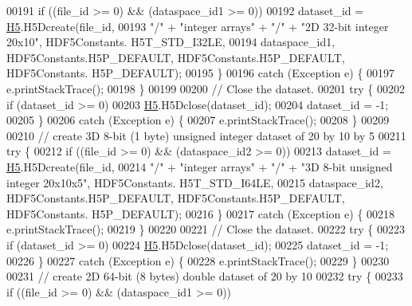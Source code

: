 \begin{DoxyCode}
00191             \textcolor{keywordflow}{if} ((file\_id >= 0) && (dataspace\_id1 >= 0))
00192                 dataset\_id = \hyperlink{namespace_h5}{H5}.H5Dcreate(file\_id,
00193                         \textcolor{stringliteral}{"/"} + \textcolor{stringliteral}{"integer arrays"} + \textcolor{stringliteral}{"/"} + \textcolor{stringliteral}{"2D 32-bit integer 20x10"}, HDF5Constants.
      H5T\_STD\_I32LE,
00194                         dataspace\_id1, HDF5Constants.H5P\_DEFAULT, HDF5Constants.H5P\_DEFAULT, HDF5Constants.
      H5P\_DEFAULT);
00195         \}
00196         \textcolor{keywordflow}{catch} (Exception e) \{
00197             e.printStackTrace();
00198         \}
00199 
00200         \textcolor{comment}{// Close the dataset.}
00201         \textcolor{keywordflow}{try} \{
00202             \textcolor{keywordflow}{if} (dataset\_id >= 0)
00203                 \hyperlink{namespace_h5}{H5}.H5Dclose(dataset\_id);
00204             dataset\_id = -1;
00205         \}
00206         \textcolor{keywordflow}{catch} (Exception e) \{
00207             e.printStackTrace();
00208         \}
00209 
00210         \textcolor{comment}{// create 3D 8-bit (1 byte) unsigned integer dataset of 20 by 10 by 5}
00211         \textcolor{keywordflow}{try} \{
00212             \textcolor{keywordflow}{if} ((file\_id >= 0) && (dataspace\_id2 >= 0))
00213                 dataset\_id = \hyperlink{namespace_h5}{H5}.H5Dcreate(file\_id,
00214                         \textcolor{stringliteral}{"/"} + \textcolor{stringliteral}{"integer arrays"} + \textcolor{stringliteral}{"/"} + \textcolor{stringliteral}{"3D 8-bit unsigned integer 20x10x5"}, HDF5Constants.
      H5T\_STD\_I64LE,
00215                         dataspace\_id2, HDF5Constants.H5P\_DEFAULT, HDF5Constants.H5P\_DEFAULT, HDF5Constants.
      H5P\_DEFAULT);
00216         \}
00217         \textcolor{keywordflow}{catch} (Exception e) \{
00218             e.printStackTrace();
00219         \}
00220 
00221         \textcolor{comment}{// Close the dataset.}
00222         \textcolor{keywordflow}{try} \{
00223             \textcolor{keywordflow}{if} (dataset\_id >= 0)
00224                 \hyperlink{namespace_h5}{H5}.H5Dclose(dataset\_id);
00225             dataset\_id = -1;
00226         \}
00227         \textcolor{keywordflow}{catch} (Exception e) \{
00228             e.printStackTrace();
00229         \}
00230 
00231         \textcolor{comment}{// create 2D 64-bit (8 bytes) double dataset of 20 by 10}
00232         \textcolor{keywordflow}{try} \{
00233             \textcolor{keywordflow}{if} ((file\_id >= 0) && (dataspace\_id1 >= 0))

\end{DoxyCode}
